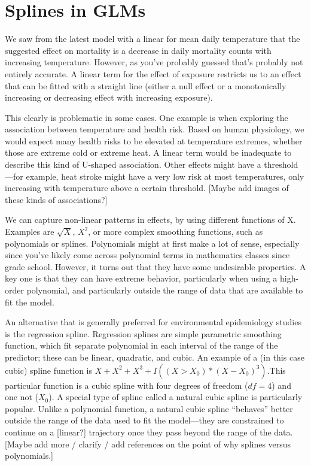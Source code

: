 \documentclass[
]{book}
\begin{document}
\hypertarget{splines-in-glms}{%
\section{Splines in GLMs}\label{splines-in-glms}}

We saw from the latest model with a linear for mean daily temperature that the
suggested effect on mortality is a decrease in daily mortality counts with
increasing temperature. However, as you've probably guessed that's probably not
entirely accurate. A linear term for the effect of exposure restricts us to an
effect that can be fitted with a straight line (either a null effect or a
monotonically increasing or decreasing effect with increasing exposure).

This clearly is problematic in some cases. One example is when exploring the
association between temperature and health risk. Based on human physiology,
we would expect many health risks to be elevated at temperature extremes,
whether those are extreme cold or extreme heat. A linear term would be
inadequate to describe this kind of U-shaped association. Other effects might
have a threshold---for example, heat stroke might have a very low risk at
most temperatures, only increasing with temperature above a certain threshold.
{[}Maybe add images of these kinds of associations?{]}

We can
capture non-linear patterns in effects, by using different functions of X.
Examples are \(\sqrt{X}\), \(X^{2}\), or more complex smoothing functions, such as
polynomials or splines. Polynomials might at first make a lot of sense,
especially since you've likely come across polynomial terms in mathematics
classes since grade school. However, it turns out that they have some undesirable
properties. A key one is that they can have extreme behavior, particularly
when using a high-order polynomial, and particularly outside the range of
data that are available to fit the model.

An alternative that is generally preferred for environmental epidemiology
studies is the regression spline.
Regression splines are simple parametric smoothing function,
which fit separate polynomial in each interval of the range of the predictor; these
can be linear, quadratic, and cubic. An example of a (in this case cubic) spline
function is \(X+X^{2}+X^{3}+I((X>X_{0})*(X-X_{0})^3)\).This particular function is
a cubic spline with four degrees of freedom (\(df=4\)) and one not (\(X_{0}\)).
A special type of spline called a natural cubic spline is particularly popular.
Unlike a polynomial function, a natural cubic spline ``behaves'' better outside
the range of the data used to fit the model---they are constrained to continue
on a {[}linear?{]} trajectory once they pass beyond the range of the data.
{[}Maybe add more / clarify / add references on the point of why splines versus
polynomials.{]}
\end{document}

